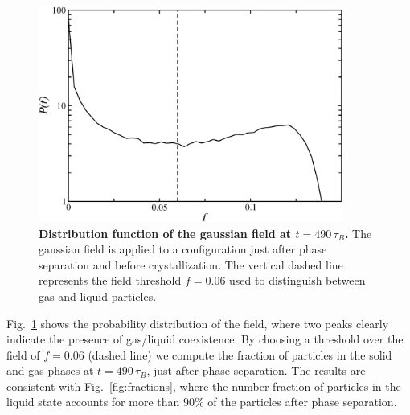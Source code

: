 \begin{figure}[!t]
 \centering
 \includegraphics[width=10cm]{./field.pdf}
 \caption{{\bf Distribution function of the gaussian field at $t=490\,\tau_B$.} The gaussian field is applied to
 a configuration just after phase separation and before crystallization. The vertical dashed line represents the
 field threshold $f=0.06$ used to distinguish between gas and liquid particles.}
 \label{fig:field}
\end{figure}

Fig.~\ref{fig:field} shows the probability distribution of the field, where two peaks clearly indicate the presence
of gas/liquid coexistence. By choosing a threshold over the field of $f=0.06$ (dashed line) we compute the fraction
of particles in the solid and gas phases at $t=490\,\tau_B$, just after phase separation. The results are consistent
with Fig.~\ref{fig:fractions}, where the number fraction of particles in the liquid state accounts for more than
$90\%$ of the particles after phase separation.

